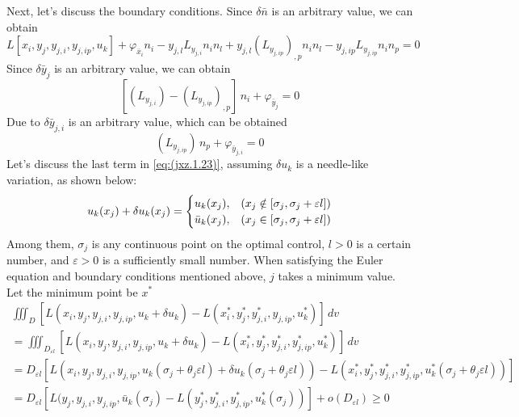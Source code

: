 Next, let's discuss the boundary conditions. Since $ \delta \bar {n}$  is an arbitrary value, we can obtain
\begin{equation} \label{eq:(jxz.1.25)}    
L[x_i,y_j,y_{j,i},y_{j,ip},u_k]+ \varphi_{\bar {x}_i } n_i 
-y_{j,l} L_{y_{j,i}} n_i n_l   + y_{j,l} \left(L_{y_{j,ip}}\right)_{,p} n_i n_l 
-y_{j,ip} L_{y_{j,ip}} n_i  n_p =0
\end{equation}
Since $ \delta \bar {y} _j $ is an arbitrary value, we can obtain
\begin{equation} \label{eq:(jxz.1.26)}    
[\left(L_{y_{j,i}}  \right) -\left(L_{y_{j,ip}}\right)_{,p}]\,n_i + \varphi_{\bar {y}_j}=0
\end{equation}
Due to $ \delta \bar {y}_ {j, i}$  is an arbitrary value, which can be obtained
\begin{equation} \label{eq:(jxz.1.27)}    
\left(L_{y_{j,ip}}  \right)\,n_p +\varphi_{\bar {y}_ {j,i}} =0
\end{equation}
Let's discuss the last term in \ref{eq:(jxz.1.23)}, assuming $ \delta u_k $ is a needle-like variation, as shown below:
\begin{equation} \label{eq:(jxz.1.28)}    
u_k(x_j)+\delta u_k(x_j)=
\begin{cases}
u_k(x_j), & \text(x_j \notin [\sigma_j,\sigma_j+\varepsilon l])\\
\bar {u}_k (x_j), & \text(x_j \in [\sigma_j,\sigma_j+\varepsilon l])
\end{cases}
\end{equation}
Among them, $ \sigma_j$  is any continuous point on the optimal control, $ l>0 $ is a certain number, and $ \varepsilon>0 $ is a sufficiently small number. When satisfying the Euler equation and boundary conditions mentioned above, $ j$  takes a minimum value. Let the minimum point be $ x ^ * $ 
\begin{multline} \label{eq:(jxz.1.29)}    
\iiint_D [L(x_i,y_j,y_{j,i},y_{j,ip},u_k+\delta u_k)-L(x^*_i,y^*_j,y^*_{j,i},y_{j,ip},u^*_k)] \,dv
\\=\iiint_{D_{\varepsilon l}}[L(x_i,y_j,y_{j,i},y_{j,ip},u_k+\delta u_k)-L(x^*_i,y^*_j,y^*_{j,i},y^*_{j,ip},u^*_k)] \,dv
\\={D_{\varepsilon l}} [L(x_i,y_j,y_{j,i},y_{j,ip},u_k(\sigma_j+\theta_j \varepsilon l)+\delta u_k(\sigma_j+\theta_j \varepsilon l))- L(x^*_i,y^*_j,y^*_{j,i},y^*_{j,ip},u^*_k(\sigma_j+\theta_j \varepsilon l))]
\\={D_{\varepsilon l}} [L(y_j,y_{j,i},y_{j,ip},\bar {u}_k (\sigma_j)- L(y^*_j,y^*_{j,i},y^*_{j,ip},u^*_k(\sigma_j))]+o({D_{\varepsilon l}}) \geq 0
\end{multline}
